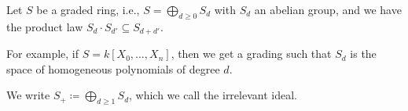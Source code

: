Let $S$ be a graded ring, i.e., $S = \bigoplus_{d\geq 0} S_d$ with $S_d$ an abelian
group, and we have the product law $S_d\cdot S_{d'} \subseteq S_{d+d'}$.

For example, if $S = k[X_0, \ldots, X_n]$, then we get a grading such that $S_d$
is the space of homogeneous polynomials of degree $d$.

We write $S_+ \coloneqq \bigoplus_{d\geq 1} S_d$, which we call the irrelevant ideal.
